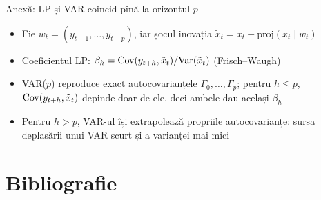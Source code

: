 \begin{frame}{Anexă: LP și VAR coincid pînă la orizontul $p$}
\hypertarget{atsapp3}{}
\itemsize{\small}
\begin{itemize}
    \item Fie $w_t = (y_{t-1}, \dots, y_{t-p})$, iar șocul inovația $\tilde x_t = x_t - \mathrm{proj}(x_t\mid w_t)$
    \item Coeficientul LP: $\beta_h = \text{Cov}(y_{t+h}, \tilde x_t)/\text{Var}(\tilde x_t)$ (Frisch--Waugh)
    \item VAR($p$) reproduce exact autocovarianțele $\Gamma_0, \dots, \Gamma_p$; pentru $h \le p$, $\text{Cov}(y_{t+h}, \tilde x_t)$ depinde doar de ele, deci ambele dau același $\beta_h$ 
    \item Pentru $h > p$, VAR-ul își extrapolează propriile autocovarianțe: sursa deplasării unui VAR scurt și a varianței mai mici
\end{itemize}
\end{frame}


\section{Bibliografie}

